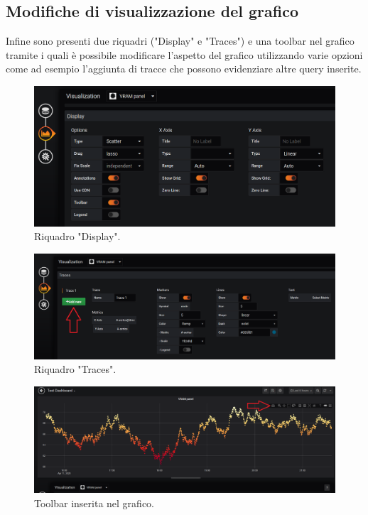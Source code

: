     \subsection{Modifiche di visualizzazione del grafico}
        Infine sono presenti due riquadri ("Display" e "Traces") e una toolbar nel grafico tramite i quali è possibile modificare l'aspetto del grafico utilizzando varie opzioni come ad esempio l'aggiunta di tracce che possono evidenziare altre query inserite.
        \begin{figure}[H]
            \includegraphics[width=\textwidth,height=\textheight,keepaspectratio]{img/display.png}
            \caption{Riquadro "Display".}
        \end{figure}
        \begin{figure}[H]
            \includegraphics[width=\textwidth,height=\textheight,keepaspectratio]{img/traces.png}
            \caption{Riquadro "Traces".}
        \end{figure}
        \begin{figure}[H]
            \includegraphics[width=\textwidth,height=\textheight,keepaspectratio]{img/toolbar.png}
            \caption{Toolbar inserita nel grafico.}
        \end{figure}